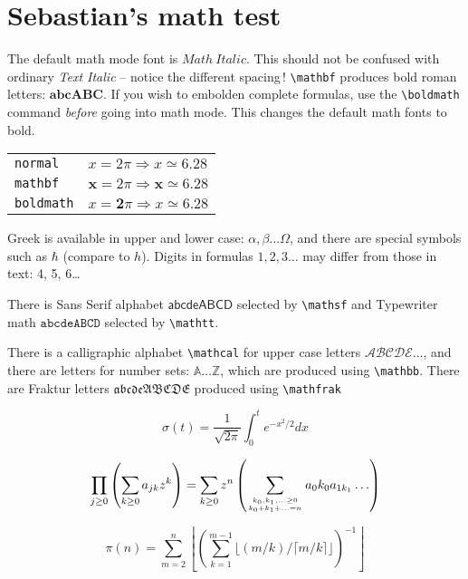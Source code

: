 \documentclass{article}
\begin{document}
\section{Sebastian's math test}



The default math mode font is $Math\ Italic$. This should not be
confused with ordinary \emph{Text Italic} -- notice the different spacing\,!
\verb|\mathbf| produces bold roman letters: $ \mathbf{abcABC} $.
If you wish to embolden complete formulas,
use the \verb|\boldmath| command \emph{before} going into math mode.  
This changes the default math fonts to bold. 
 
\begin{tabular}{ll}
\texttt{normal}   & $ x = 2\pi \Rightarrow x \simeq 6.28 $\\
\texttt{mathbf}   & $\mathbf{x} = 2\pi \Rightarrow \mathbf{x} \simeq 6.28 $\\
\texttt{boldmath} & {\boldmath $x = \mathbf{2}\pi \Rightarrow x 
                    \simeq{\mathbf{6.28}}              $}\\
\end{tabular}
\smallskip

Greek is available in upper and lower case:
$\alpha,\beta \dots \Omega$, and there are special
symbols such as $ \hbar$ (compare to $h$).
Digits in formulas $1, 2, 3\dots$ may differ from those in text: 4, 5,
6\dots

There is Sans Serif alphabet $\mathsf{abcdeABCD}$ selected by
\verb|\mathsf| and Typewriter math $\mathtt{abcdeABCD}$ selected by
\verb|\mathtt|. 

There is a calligraphic alphabet \verb|\mathcal| for upper case letters
$ \mathcal{ABCDE}\dots $, and there are letters for number sets: $\mathbb{A\dots Z} $,
which are produced using \verb|\mathbb|.  There are Fraktur letters
$\mathfrak{abcdeABCDE}$ produced using \verb|\mathfrak|
 
\begin{equation}
  \sigma(t)=\frac{1}{\sqrt{2\pi}}
  \int^t_0 e^{-x^2/2} dx 
\end{equation}

\begin{equation}
  \prod_{j\geq 0}
  \left(\sum_{k\geq 0}a_{jk} z^k\right) 
= \sum_{k\geq 0} z^n
  \left( \sum_{{k_0,k_1,\ldots\geq 0}
          \atop{k_0+k_1+\ldots=n}    }
        a{_0k_0}a_{1k_1}\ldots  \right) 
\end{equation}

\begin{equation}
\pi(n) = \sum_{m=2}^{n}
  \left\lfloor \left(\sum_{k=1}^{m-1}
       \lfloor(m/k)/\lceil m/k\rceil 
       \rfloor \right)^{-1}
  \right\rfloor
\end{equation}
\end{document}
